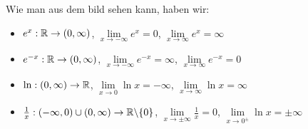 \begin{minipage}{\linewidth}
\begin{center}
\begin{tikzpicture}[x=1.15cm, y=0.5cm]
\end{tikzpicture}
\end{center}
Wie man aus dem bild sehen kann, haben wir:
\begin{itemize}
    \item $e^x: \mathbb{R} \to (0, \infty)$, $\lim\limits_{x\to -\infty} e^x = 0$, $\lim\limits_{x\to \infty} e^x = \infty$
    \item $e^{-x}: \mathbb{R} \to (0, \infty)$, $\lim\limits_{x\to -\infty} e^{-x} = \infty$, $\lim\limits_{x\to \infty} e^{-x} = 0$
    \item $\ln: (0, \infty) \to \mathbb{R}$, $\lim\limits_{x\to 0} \ln x = -\infty$, $\lim\limits_{x\to \infty} \ln x = \infty$
    \item $\frac{1}{x}: (-\infty, 0) \cup (0, \infty) \to \mathbb{R}\backslash\{0\}$, $\lim\limits_{x\to \pm \infty} \frac{1}{x} = 0$, $\lim\limits_{x\to 0^\pm} \ln x = \pm\infty$
\end{itemize}
\end{minipage}

